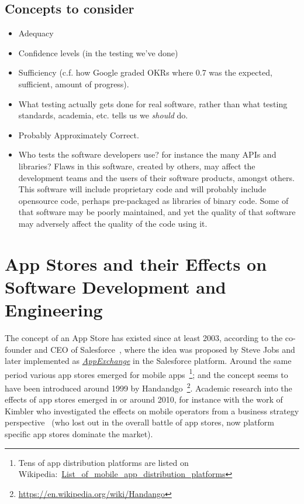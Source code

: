 \subsection{Concepts to consider}
\begin{itemize}
    \item Adequacy
    \item Confidence levels (in the testing we've done)
    \item Sufficiency (c.f. how Google graded OKRs where 0.7 was the expected, sufficient, amount of progress).
    \item What testing actually gets done for real software, rather than what testing standards, academia, etc. tells us we \emph{should} do.
    \item Probably Approximately Correct.
    \item Who tests the software developers use? for instance the many APIs and libraries? Flaws in this software, created by others, may affect the development teams and the users of their software products, amongst others. This software will include proprietary code and will probably include opensource code, perhaps pre-packaged as libraries of binary code. Some of that software may be poorly maintained, and yet the quality of that software may adversely affect the quality of the code using it. 
\end{itemize}

\section{App Stores and their Effects on Software Development and Engineering}
The concept of an App Store has existed since at least 2003, according to the co-founder and CEO of Salesforce~\cite{benioff_trailblazer_2019}, where the idea was proposed by Steve Jobs and later implemented as \href{https://appexchange.salesforce.com/}{\emph{AppExchange}} in the Salesforce platform. Around the same period various app stores emerged for mobile apps~\footnote{Tens of app distribution platforms are listed on Wikipedia:~\href{https://en.wikipedia.org/wiki/List_of_mobile_app_distribution_platforms}{List\_of\_mobile\_app\_distribution\_platforms}}; and the concept seems to have been introduced around 1999 by Handandgo~\footnote{\url{https://en.wikipedia.org/wiki/Handango}}. Academic research into the effects of app stores emerged in or around 2010, for instance with the work of Kimbler who investigated the effects on mobile operators from a business strategy perspective~\cite{kimbler_app_store_strategies_2010} (who lost out in the overall battle of app stores, now platform specific app stores dominate the market). 

